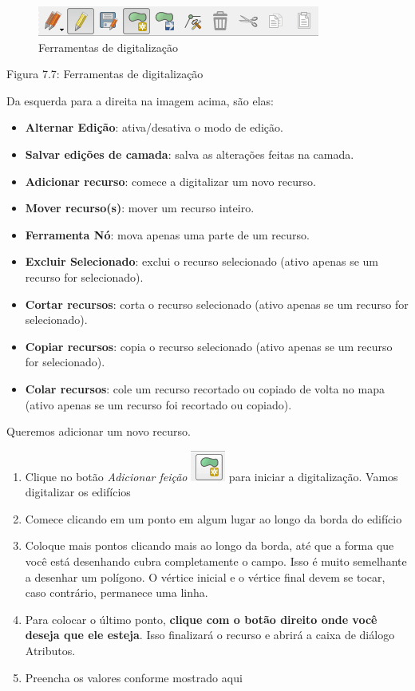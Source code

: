 \documentclass[
]{krantz}
\providecommand{\tightlist}{%
  \setlength{\itemsep}{0pt}\setlength{\parskip}{0pt}}
\begin{document}
\begin{figure}
\centering
\includegraphics{media/modulo7/digi-toolbar.png}
\caption{Ferramentas de digitalização}
\end{figure}

Figura 7.7: Ferramentas de digitalização

Da esquerda para a direita na imagem acima, são elas:

\begin{itemize}
\tightlist
\item
  \textbf{Alternar Edição}: ativa/desativa o modo de edição.
\item
  \textbf{Salvar edições de camada}: salva as alterações feitas na camada.
\item
  \textbf{Adicionar recurso}: comece a digitalizar um novo recurso.
\item
  \textbf{Mover recurso(s)}: mover um recurso inteiro.
\item
  \textbf{Ferramenta Nó}: mova apenas uma parte de um recurso.
\item
  \textbf{Excluir Selecionado}: exclui o recurso selecionado (ativo apenas se um recurso for selecionado).
\item
  \textbf{Cortar recursos}: corta o recurso selecionado (ativo apenas se um recurso for selecionado).
\item
  \textbf{Copiar recursos}: copia o recurso selecionado (ativo apenas se um recurso for selecionado).
\item
  \textbf{Colar recursos}: cole um recurso recortado ou copiado de volta no mapa (ativo apenas se um recurso foi recortado ou copiado).
\end{itemize}

Queremos adicionar um novo recurso.

\begin{enumerate}
\def\labelenumi{\arabic{enumi}.}
\setcounter{enumi}{10}
\tightlist
\item
  Clique no botão \emph{Adicionar feição} \includegraphics{media/modulo7/add-feature.png} para iniciar a digitalização. Vamos digitalizar os edifícios
\item
  Comece clicando em um ponto em algum lugar ao longo da borda do edifício
\item
  Coloque mais pontos clicando mais ao longo da borda, até que a forma que você está desenhando cubra completamente o campo. Isso é muito semelhante a desenhar um polígono. O vértice inicial e o vértice final devem se tocar, caso contrário, permanece uma linha.
\item
  Para colocar o último ponto, \textbf{clique com o botão direito onde você deseja que ele esteja}. Isso finalizará o recurso e abrirá a caixa de diálogo Atributos.
\item
  Preencha os valores conforme mostrado aqui
\end{enumerate}
\end{document}
